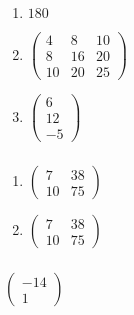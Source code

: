 \documentclass{article}
\begin{document}
\setcounter{subsubsection}{20}
\subsubsection{}

\begin{enumerate}
  \item $180$

  \item $\begin{pmatrix}
            4  & 8  & 10 \\
            8  & 16 & 20 \\
            10 & 20 & 25
          \end{pmatrix}$

  \item $\begin{pmatrix}
            6  \\
            12 \\
            -5
          \end{pmatrix}$
\end{enumerate}

\setcounter{subsubsection}{22}
\subsubsection{}

\begin{enumerate}
  \item $\begin{pmatrix}
            7  & 38 \\
            10 & 75
          \end{pmatrix}$

  \item $\begin{pmatrix}
            7  & 38 \\
            10 & 75
          \end{pmatrix}$
\end{enumerate}

\setcounter{subsubsection}{24}
\subsubsection{}

$\begin{pmatrix}
    -14 \\
    1
  \end{pmatrix}$

\setcounter{subsubsection}{26}
\end{document}
